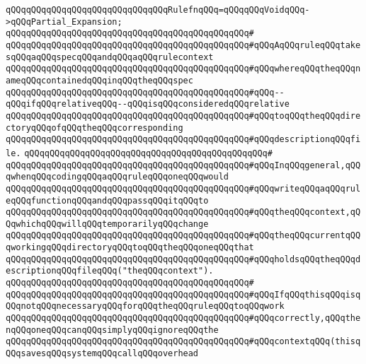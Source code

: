 \newline
\verb|qQQqqQQqqQQqqQQqqQQqqQQqqQQqqQQqRulefnqQQq=qQQqqQQqVoidqQQq->qQQqPartial_Expansion;|\newline
\verb|qQQqqQQqqQQqqQQqqQQqqQQqqQQqqQQqqQQqqQQqqQQqqQQq#|\newline
\verb|qQQqqQQqqQQqqQQqqQQqqQQqqQQqqQQqqQQqqQQqqQQqqQQq#qQQqAqQQqruleqQQqtakesqQQqaqQQqspecqQQqandqQQqaqQQqrulecontext|\newline
\verb|qQQqqQQqqQQqqQQqqQQqqQQqqQQqqQQqqQQqqQQqqQQqqQQq#qQQqwhereqQQqtheqQQqnameqQQqcontainedqQQqinqQQqtheqQQqspec|\newline
\verb|qQQqqQQqqQQqqQQqqQQqqQQqqQQqqQQqqQQqqQQqqQQqqQQq#qQQq--qQQqifqQQqrelativeqQQq--qQQqisqQQqconsideredqQQqrelative|\newline
\verb|qQQqqQQqqQQqqQQqqQQqqQQqqQQqqQQqqQQqqQQqqQQqqQQq#qQQqtoqQQqtheqQQqdirectoryqQQqofqQQqtheqQQqcorresponding|\newline
\verb|qQQqqQQqqQQqqQQqqQQqqQQqqQQqqQQqqQQqqQQqqQQqqQQq#qQQqdescriptionqQQqfile.|\newline
\verb|qQQqqQQqqQQqqQQqqQQqqQQqqQQqqQQqqQQqqQQqqQQqqQQq#|\newline
\verb|qQQqqQQqqQQqqQQqqQQqqQQqqQQqqQQqqQQqqQQqqQQqqQQq#qQQqInqQQqgeneral,qQQqwhenqQQqcodingqQQqaqQQqruleqQQqoneqQQqwould|\newline
\verb|qQQqqQQqqQQqqQQqqQQqqQQqqQQqqQQqqQQqqQQqqQQqqQQq#qQQqwriteqQQqaqQQqruleqQQqfunctionqQQqandqQQqpassqQQqitqQQqto|\newline
\verb|qQQqqQQqqQQqqQQqqQQqqQQqqQQqqQQqqQQqqQQqqQQqqQQq#qQQqtheqQQqcontext,qQQqwhichqQQqwillqQQqtemporarilyqQQqchange|\newline
\verb|qQQqqQQqqQQqqQQqqQQqqQQqqQQqqQQqqQQqqQQqqQQqqQQq#qQQqtheqQQqcurrentqQQqworkingqQQqdirectoryqQQqtoqQQqtheqQQqoneqQQqthat|\newline
\verb|qQQqqQQqqQQqqQQqqQQqqQQqqQQqqQQqqQQqqQQqqQQqqQQq#qQQqholdsqQQqtheqQQqdescriptionqQQqfileqQQq("theqQQqcontext").|\newline
\verb|qQQqqQQqqQQqqQQqqQQqqQQqqQQqqQQqqQQqqQQqqQQqqQQq#|\newline
\verb|qQQqqQQqqQQqqQQqqQQqqQQqqQQqqQQqqQQqqQQqqQQqqQQq#qQQqIfqQQqthisqQQqisqQQqnotqQQqnecessaryqQQqforqQQqtheqQQqruleqQQqtoqQQqwork|\newline
\verb|qQQqqQQqqQQqqQQqqQQqqQQqqQQqqQQqqQQqqQQqqQQqqQQq#qQQqcorrectly,qQQqthenqQQqoneqQQqcanqQQqsimplyqQQqignoreqQQqthe|\newline
\verb|qQQqqQQqqQQqqQQqqQQqqQQqqQQqqQQqqQQqqQQqqQQqqQQq#qQQqcontextqQQq(thisqQQqsavesqQQqsystemqQQqcallqQQqoverhead|\newline
